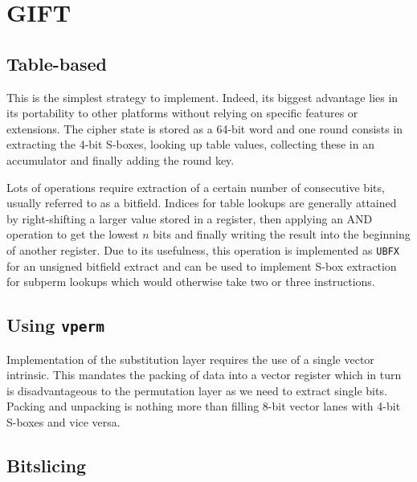 \section{GIFT}
\subsection{Table-based}

This is the simplest strategy to implement. Indeed, its biggest advantage lies
in its portability to other platforms without relying on specific features or
extensions. The cipher state is stored as a 64-bit word and one round consists
in extracting the 4-bit S-boxes, looking up table values, collecting these in
an accumulator and finally adding the round key.




Lots of operations require extraction of a certain number of consecutive bits,
usually referred to as a bitfield. Indices for table lookups are generally
attained by right-shifting a larger value stored in a register, then applying
an AND operation to get the lowest $n$ bits and finally writing the result into
the beginning of another register. Due to its usefulness, this operation is
implemented as \texttt{UBFX} for an unsigned bitfield extract and can be used
to implement S-box extraction for subperm lookups which would otherwise take
two or three instructions.

\subsection{Using \texttt{vperm}}

Implementation of the substitution layer requires the use of a single vector
intrinsic. This mandates the packing of data into a vector register which in
turn is disadvantageous to the permutation layer as we need to extract single
bits. Packing and unpacking is nothing more than filling 8-bit vector lanes
with 4-bit S-boxes and vice versa.





\subsection{Bitslicing}
